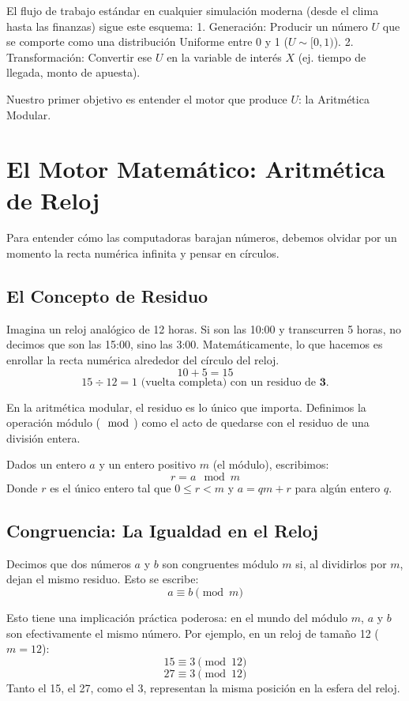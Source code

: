 \documentclass[11pt, letterpaper]{article}
\begin{document}
El flujo de trabajo estándar en cualquier simulación moderna (desde el clima hasta las finanzas) sigue este esquema:
1.  Generación: Producir un número $U$ que se comporte como una distribución Uniforme entre 0 y 1 ($U \sim [0,1)$).
2.  Transformación: Convertir ese $U$ en la variable de interés $X$ (ej. tiempo de llegada, monto de apuesta).

Nuestro primer objetivo es entender el motor que produce $U$: la Aritmética Modular.

\section{El Motor Matemático: Aritmética de Reloj}

Para entender cómo las computadoras barajan números, debemos olvidar por un momento la recta numérica infinita y pensar en círculos.

\subsection{El Concepto de Residuo}
Imagina un reloj analógico de 12 horas. Si son las 10:00 y transcurren 5 horas, no decimos que son las 15:00, sino las 3:00. Matemáticamente, lo que hacemos es enrollar la recta numérica alrededor del círculo del reloj.
$$ 10 + 5 = 15 $$
$$ 15 \div 12 = 1 \text{ (vuelta completa) con un residuo de } \mathbf{3}. $$

En la aritmética modular, el residuo es lo único que importa. Definimos la operación módulo ($\mod$) como el acto de quedarse con el residuo de una división entera.

\begin{definicionbox}
Dados un entero $a$ y un entero positivo $m$ (el módulo), escribimos:
$$ r = a \mod m $$
Donde $r$ es el único entero tal que $0 \leq r < m$ y $a = qm + r$ para algún entero $q$.
\end{definicionbox}

\subsection{Congruencia: La Igualdad en el Reloj}
Decimos que dos números $a$ y $b$ son congruentes módulo $m$ si, al dividirlos por $m$, dejan el mismo residuo. Esto se escribe:
$$ a \equiv b \pmod m $$

Esto tiene una implicación práctica poderosa: en el mundo del módulo $m$, $a$ y $b$ son efectivamente el mismo número. Por ejemplo, en un reloj de tamaño 12 ($m=12$):
$$ 15 \equiv 3 \pmod{12} $$
$$ 27 \equiv 3 \pmod{12} $$
Tanto el 15, el 27, como el 3, representan la misma posición en la esfera del reloj.
\end{document}
